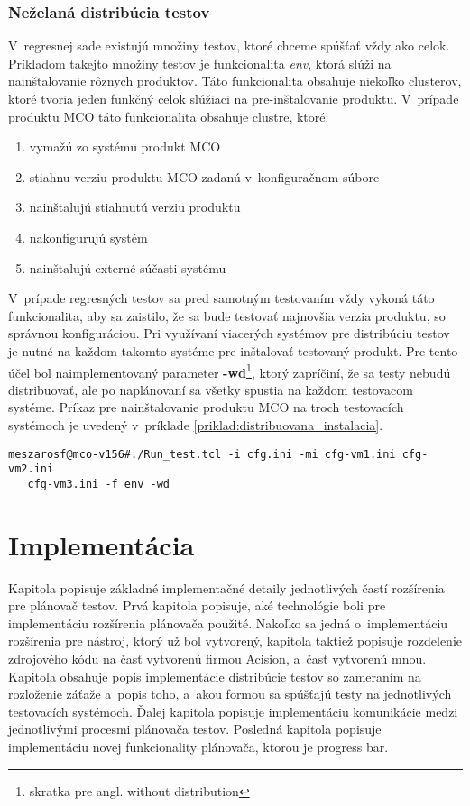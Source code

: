 \subsection*{Neželaná distribúcia testov}
V~regresnej sade existujú množiny testov, ktoré chceme spúšťať vždy ako celok.
Príkladom takejto množiny testov je funkcionalita \textit{env}, ktorá
slúži na nainštalovanie rôznych produktov. Táto funkcionalita obsahuje niekoľko clusterov,
ktoré tvoria jeden funkčný celok slúžiaci na pre-inštalovanie produktu.
V~prípade produktu MCO táto funkcionalita obsahuje clustre, ktoré:
\begin{enumerate}
\item vymažú zo systému produkt MCO
\item stiahnu verziu produktu MCO zadanú v~konfiguračnom súbore
\item nainštalujú stiahnutú verziu produktu
\item nakonfigurujú systém
\item nainštalujú externé súčasti systému
\end{enumerate} 

V~prípade regresných testov sa pred samotným testovaním vždy vykoná táto 
funkcionalita, aby sa zaistilo, že sa bude testovať najnovšia verzia produktu,
so správnou konfiguráciou.
Pri využívaní viacerých systémov pre distribúciu testov je nutné na každom
takomto systéme pre-inštalovať testovaný produkt. 
Pre tento účel bol naimplementovaný parameter 
\textbf{-wd}\footnote{skratka pre angl. without distribution}, 
ktorý zapríčiní, že sa testy nebudú distribuovať, ale po naplánovaní 
sa všetky spustia na každom testovacom systéme. 
Príkaz pre nainštalovanie produktu MCO na troch testovacích systémoch 
je uvedený v~príklade \ref{priklad:distribuovana_instalacia}.

\begin{lstlisting}[caption=Inštalácia produktu MCO na troch systémoch súčasne,
label=priklad:distribuovana_instalacia]
meszarosf@mco-v156#./Run_test.tcl -i cfg.ini -mi cfg-vm1.ini cfg-vm2.ini 
   cfg-vm3.ini -f env -wd
\end{lstlisting}


%
%
\chapter{Implementácia}
\label{kapitola:implementacia}
Kapitola popisuje základné implementačné detaily jednotlivých častí 
rozšírenia pre plánovač testov. Prvá kapitola popisuje, aké 
technológie boli pre implementáciu rozšírenia plánovača použité.
Nakoľko sa jedná o~implementáciu rozšírenia pre nástroj, ktorý už bol 
vytvorený, kapitola taktiež popisuje rozdelenie zdrojového kódu na časť 
vytvorenú firmou Acision, a~časť vytvorenú mnou.
Kapitola obsahuje popis implementácie distribúcie testov so zameraním na 
rozloženie záťaže a~popis toho, a~akou formou sa spúšťajú testy na jednotlivých 
testovacích systémoch. Ďalej kapitola popisuje implementáciu 
komunikácie medzi jednotlivými procesmi plánovača testov.
Posledná kapitola popisuje implementáciu 
novej funkcionality plánovača, ktorou je progress bar.

